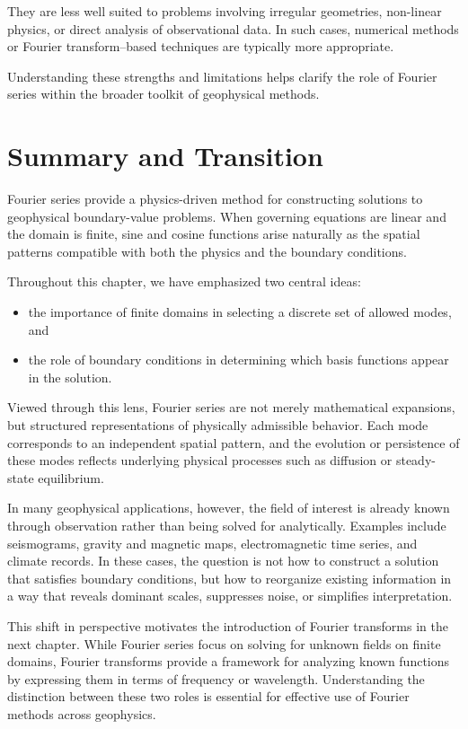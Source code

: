 They are less well suited to problems involving irregular geometries, non-linear physics, or direct analysis of observational data. In such cases, numerical methods or Fourier transform–based techniques are typically more appropriate.

Understanding these strengths and limitations helps clarify the role of Fourier series within the broader toolkit of geophysical methods.


\section{Summary and Transition}

Fourier series provide a physics-driven method for constructing solutions to geophysical boundary-value problems. When governing equations are linear and the domain is finite, sine and cosine functions arise naturally as the spatial patterns compatible with both the physics and the boundary conditions.

Throughout this chapter, we have emphasized two central ideas:
\begin{itemize}
    \item the importance of finite domains in selecting a discrete set of allowed modes, and
    \item the role of boundary conditions in determining which basis functions appear in the solution.
\end{itemize}

Viewed through this lens, Fourier series are not merely mathematical expansions, but structured representations of physically admissible behavior. Each mode corresponds to an independent spatial pattern, and the evolution or persistence of these modes reflects underlying physical processes such as diffusion or steady-state equilibrium.

In many geophysical applications, however, the field of interest is already known through observation rather than being solved for analytically. Examples include seismograms, gravity and magnetic maps, electromagnetic time series, and climate records. In these cases, the question is not how to construct a solution that satisfies boundary conditions, but how to reorganize existing information in a way that reveals dominant scales, suppresses noise, or simplifies interpretation.

This shift in perspective motivates the introduction of Fourier transforms in the next chapter. While Fourier series focus on solving for unknown fields on finite domains, Fourier transforms provide a framework for analyzing known functions by expressing them in terms of frequency or wavelength. Understanding the distinction between these two roles is essential for effective use of Fourier methods across geophysics.
